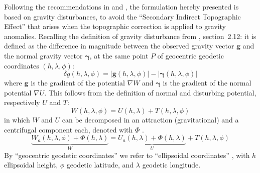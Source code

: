 Following the recommendations in \textcite{Hackney2003} and \textcite{Vajda2007}, the formulation hereby presented is based on gravity disturbances, to avoid the ``Secondary Indirect Topographic Effect'' that arises when the topographic correction is applied to gravity anomalies.
Recalling the definition of gravity disturbance from \textcite{HofmannWellenhof2006}, section~2.12: it is defined as the difference in magnitude between the observed gravity vector $\bm{g}$ and the normal gravity vector $\bm{\gamma}$, at the same point $P$ of geocentric geodetic coordinates $(h, \lambda, \phi)$:
\begin{equation}
    \label{eq:red:GravDist}
    \delta g (h, \lambda, \phi) =
    \lvert \bm{g}(h, \lambda, \phi) \rvert -
    \lvert \bm{\gamma}(h, \lambda, \phi) \rvert
\end{equation}
where $\bm{g}$ is the gradient of the potential $\nabla W$ and $\bm{\gamma}$ is the gradient of the normal potential $\nabla U$.
This follows from the definition of normal and disturbing potential, respectively $U$ and $T$:
\begin{equation}
    \label{eq:red:Pot}
    W(h, \lambda, \phi) = U(h, \lambda) + T(h, \lambda, \phi)
\end{equation}
in which $W$ and $U$ can be decomposed in an attraction (gravitational) and a centrifugal component each, denoted with $\Phi$ \parencite[Eq.~5 and 13 in][]{Barthelmes2013}.
\begin{equation}
    \label{eq:red:PotAttr}
    \underbrace{W_{a}(h, \lambda, \phi) + \Phi(h, \lambda)}_W =
    \underbrace{U_{a}(h, \lambda) + \Phi(h, \lambda)}_U +
    T(h, \lambda, \phi)
\end{equation}
By ``geocentric geodetic coordinates'' we refer to ``ellipsoidal coordinates'' \parencite{HofmannWellenhof2006}, with $h$ ellipsoidal height, $\phi$ geodetic latitude, and $\lambda$ geodetic longitude.

